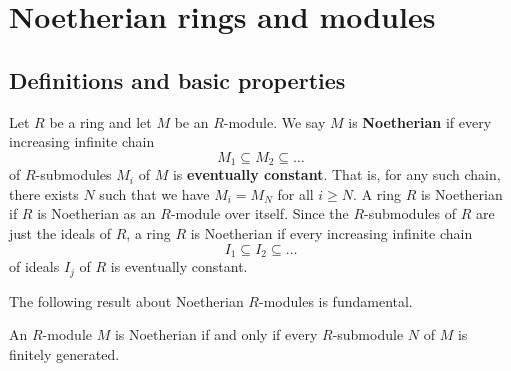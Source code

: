 \pagebreak

\section{Noetherian rings and modules}

\subsection{Definitions and basic properties}

\begin{definition}
Let $ R $ be a ring and let $ M $ be an $ R $-module. We say $ M $ is \textbf{Noetherian} if every increasing infinite chain
$$ M_1 \subseteq M_2 \subseteq \dots $$
of $ R $-submodules $ M_i $ of $ M $ is \textbf{eventually constant}. That is, for any such chain, there exists $ N $ such that we have $ M_i = M_N $ for all $ i \ge N $. A ring $ R $ is Noetherian if $ R $ is Noetherian as an $ R $-module over itself. Since the $ R $-submodules of $ R $ are just the ideals of $ R $, a ring $ R $ is Noetherian if every increasing infinite chain
$$ I_1 \subseteq I_2 \subseteq \dots $$
of ideals $ I_j $ of $ R $ is eventually constant.
\end{definition}

The following result about Noetherian $ R $-modules is fundamental.

\begin{theorem}
An $ R $-module $ M $ is Noetherian if and only if every $ R $-submodule $ N $ of $ M $ is finitely generated.
\end{theorem}

